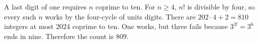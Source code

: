 A last digit of one requires $n$ coprime to ten. For $n\ge4$, $n!$ is divisible by four, so every such $n$ works by the four-cycle of units digits. There are $202\cdot4+2=810$ integers at most 2024 coprime to ten. One works, but three fails because $3^{3!}=3^6$ ends in nine. Therefore the count is $\boxed{809}$.
